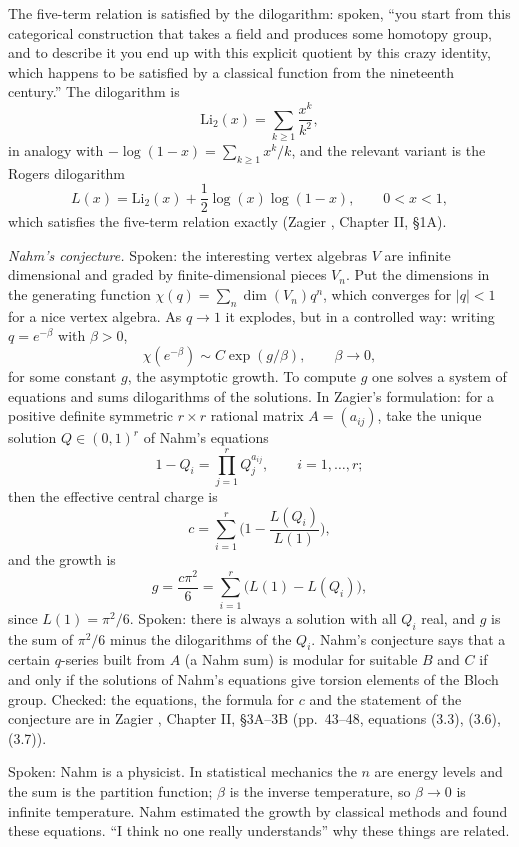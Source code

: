 The five-term relation is satisfied by the
dilogarithm: spoken, ``you start from this
categorical construction that takes a field
and produces some homotopy group, and to
describe it you end up with this explicit
quotient by this crazy identity, which
happens to be satisfied by a classical
function from the nineteenth century.'' The
dilogarithm is
$$
\mathrm{Li}_2(x)=\sum_{k\geq 1}
\frac{x^k}{k^2},
$$
in analogy with
$-\log(1-x)=\sum_{k\geq 1}x^k/k$, and the
relevant variant is the Rogers dilogarithm
$$
L(x)=\mathrm{Li}_2(x)
+\frac{1}{2}\log(x)\log(1-x),
\qquad 0<x<1,
$$
which satisfies the five-term relation
exactly
(Zagier \cite{zagier-dilog}, Chapter II,
\S 1A).

\textit{Nahm's conjecture.} Spoken: the
interesting vertex algebras $V$ are infinite
dimensional and graded by finite-dimensional
pieces $V_n$. Put the dimensions in the
generating function
$\chi(q)=\sum_n\dim(V_n)q^n$, which converges
for $|q|<1$ for a nice vertex algebra. As
$q\to 1$ it explodes, but in a controlled
way: writing $q=e^{-\beta}$ with $\beta>0$,
$$
\chi(e^{-\beta})\sim
C\exp(g/\beta),
\qquad \beta\to 0,
$$
for some constant $g$, the asymptotic growth.
To compute $g$ one solves a system of
equations and sums dilogarithms of the
solutions. In Zagier's formulation: for a
positive definite symmetric $r\times r$
rational matrix $A=(a_{ij})$, take the
unique solution $Q\in(0,1)^r$ of Nahm's
equations
$$
1-Q_i=\prod_{j=1}^r Q_j^{a_{ij}},
\qquad i=1,\ldots,r;
$$
then the effective central charge is
$$
c=\sum_{i=1}^r
\Big(1-\frac{L(Q_i)}{L(1)}\Big),
$$
and the growth is
$$
g=\frac{c\pi^2}{6}
=\sum_{i=1}^r\big(L(1)-L(Q_i)\big),
$$
since $L(1)=\pi^2/6$. Spoken: there is
always a solution with all $Q_i$ real, and
$g$ is the sum of $\pi^2/6$ minus the
dilogarithms of the $Q_i$. Nahm's
conjecture says that a certain $q$-series
built from $A$ (a Nahm sum) is modular for
suitable $B$ and $C$ if and only if the
solutions of Nahm's equations give torsion
elements of the Bloch group. Checked: the
equations, the formula for $c$ and the
statement of the conjecture are in Zagier
\cite{zagier-dilog}, Chapter II, \S 3A--3B
(pp.~43--48, equations (3.3), (3.6),
(3.7)).

Spoken: Nahm is a physicist. In statistical
mechanics the $n$ are energy levels and the
sum is the partition function; $\beta$ is
the inverse temperature, so $\beta\to 0$ is
infinite temperature. Nahm estimated the
growth by classical methods and found these
equations. ``I think no one really
understands'' why these things are related.


